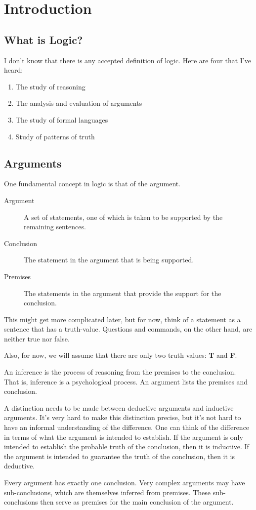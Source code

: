 
\chapter{Introduction}
\label{chap:intro}

\section{What is Logic?}
\label{sec:what-logic}

I don't know that there is any accepted definition of logic. Here are four that I've heard:

\begin{enumerate}
\item The study of reasoning
\item The analysis and evaluation of arguments
\item The study of formal languages
\item Study of patterns of truth
\end{enumerate}

\section{Arguments}
\label{sec:arguments}

One fundamental concept in logic is that of the argument.

\begin{description}
\item[Argument] A set of statements, one of which is taken to be supported by the remaining sentences.
\item[Conclusion] The statement in the argument that is being supported.
\item[Premises] The statements in the argument that provide the support for the conclusion.
\end{description}

This might get more complicated later, but for now, think of a statement as a sentence that has a truth-value. Questions and commands, on the other hand, are neither true nor false.

Also, for now, we will assume that there are only two truth values: \textbf{T} and \textbf{F}.

An inference is the process of reasoning from the premises to the conclusion. That is, inference is a psychological process. An argument lists the premises and conclusion.

A distinction needs to be made between deductive arguments and inductive arguments. It's very hard to make this distinction precise, but it's not hard to have an informal understanding of the difference. One can think of the difference in terms of what the argument is intended to establish. If the argument is only intended to establish the probable truth of the conclusion, then it is inductive. If the argument is intended to guarantee the truth of the conclusion, then it is deductive.

Every argument has exactly one conclusion. Very complex arguments may have sub-conclusions, which are themselves inferred from premises. These sub-conclusions then serve as premises for the main conclusion of the argument.

